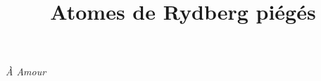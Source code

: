 \documentclass[11pt,a4paper,twoside]{book}
\title{Atomes de Rydberg piégés}
\renewcommand{\chaptermark}[1]{\markboth{Chapitre {\thechapter}. #1}{}}
\renewcommand \thechapter{\Roman{chapter}}
\begin{document}
\frontmatter
{}
\thispagestyle{empty}
\vspace*{0.2\textheight}
\begin{flushright}
\emph{\`A Amour}
\end{flushright}
\vspace*{\fill}\clearpage
\makeatletter
\let\ps@plain\ps@empty

\makeatother

\dominitoc
\tableofcontents
\thispagestyle{fancyplain}
\listoffigures \mtcaddchapter
\listoftables \mtcaddchapter
\thispagestyle{fancyplain}
\mainmatter
{}

















%
%
%
%

\renewcommand{\bibname}{References}
\printbibliography

\backmatter
\end{document}
